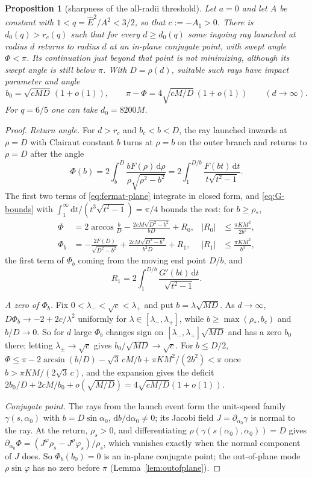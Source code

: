 \documentclass[aip,jmp,amsmath,amssymb,reprint]{revtex4-2}
\newcommand{\Ehat}{\hat E}
\newcommand{\dd}{\mathrm{d}}
\theoremstyle{plain}
\newtheorem{proposition}{Proposition}[section]
\theoremstyle{definition}
\begin{document}
\begin{proposition}[sharpness of the all-radii threshold]\label{prop:sharp32}
Let $a=0$ and let $A$ be constant with $1<q=\Ehat^2/A^2<3/2$, so that $c:=-A_1>0$. There is
$d_0(q)>r_c(q)$ such that for every $d\ge d_0(q)$ some ingoing ray launched at radius $d$ returns to
radius $d$ at an in-plane conjugate point, with swept angle $\Phi<\pi$. Its continuation just beyond that
point is not minimizing, although its swept angle is still below $\pi$. With $D=\rho(d)$, suitable such
rays have impact parameter and angle
\[
  b_0=\sqrt{cMD}\,(1+o(1)),\qquad \pi-\Phi=4\sqrt{cM/D}\,(1+o(1))\qquad(d\to\infty).
\]
For $q=6/5$ one can take $d_0=8200M$.
\end{proposition}

\begin{proof}
\emph{Return angle.} For $d>r_c$ and $b_c<b<D$, the ray launched inwards at $\rho=D$ with Clairaut
constant $b$ turns at $\rho=b$ on the outer branch and returns to $\rho=D$ after the angle
\[
  \Phi(b)=2\int_b^D\frac{bF(\rho)\,\dd\rho}{\rho\sqrt{\rho^2-b^2}}
  =2\int_1^{D/b}\frac{F(bt)\,\dd t}{t\sqrt{t^2-1}} .
\]
The first two terms of \eqref{eq:fermat-plane} integrate in closed form, and \eqref{eq:G-bounds} with
$\int_1^\infty\dd t/(t^3\sqrt{t^2-1})=\pi/4$ bounds the rest: for $b\ge\rho_*$,
\begin{align*}
  \Phi&=2\arccos\frac bD-\frac{2cM\sqrt{D^2-b^2}}{bD}+R_0,& |R_0|&\le\frac{\pi KM^2}{2b^2},\\
  \Phi_b&=-\frac{2F(D)}{\sqrt{D^2-b^2}}+\frac{2cM\sqrt{D^2-b^2}}{b^2D}+R_1,& |R_1|&\le\frac{\pi KM^2}{b^3},
\end{align*}
the first term of $\Phi_b$ coming from the moving end point $D/b$, and
\[
  R_1=2\int_1^{D/b}\frac{G'(bt)\,\dd t}{\sqrt{t^2-1}} .
\]

\emph{A zero of $\Phi_b$.} Fix $0<\lambda_-<\sqrt c<\lambda_+$ and put $b=\lambda\sqrt{MD}$. As $d\to\infty$,
$D\Phi_b\to-2+2c/\lambda^2$ uniformly for $\lambda\in[\lambda_-,\lambda_+]$, while $b\ge\max(\rho_*,b_c)$ and $b/D\to0$.
So for $d$ large $\Phi_b$ changes sign on $[\lambda_-,\lambda_+]\sqrt{MD}$ and has a zero $b_0$ there; letting
$\lambda_\pm\to\sqrt c$ gives $b_0/\sqrt{MD}\to\sqrt c$. For $b\le D/2$,
$\Phi\le\pi-2\arcsin(b/D)-\sqrt3\,cM/b+\pi KM^2/(2b^2)<\pi$ once $b>\pi KM/(2\sqrt3\,c)$, and the expansion
gives the deficit $2b_0/D+2cM/b_0+o(\sqrt{M/D})=4\sqrt{cM/D}(1+o(1))$.

\emph{Conjugate point.} The rays from the launch event form the unit-speed family $\gamma(s,\alpha_0)$
with $b=D\sin\alpha_0$, $\dd b/\dd\alpha_0\ne0$; its Jacobi field $J=\partial_{\alpha_0}\gamma$ is normal to the ray.
At the return, $\rho_s>0$, and differentiating $\rho(\gamma(s(\alpha_0),\alpha_0))=D$ gives
$\partial_{\alpha_0}\Phi=(J^\varphi\rho_s-J^\rho\varphi_s)/\rho_s$, which vanishes exactly when the normal
component of $J$ does. So $\Phi_b(b_0)=0$ is an in-plane conjugate point; the out-of-plane mode
$\rho\sin\varphi$ has no zero before $\pi$ (Lemma~\ref{lem:outofplane}).


\end{proof}
\end{document}

